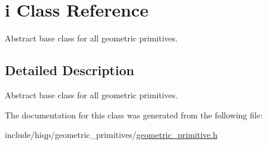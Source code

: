 \hypertarget{classi}{\section{i Class Reference}
\label{classi}
}


Abstract base class for all geometric primitives.  




\subsection{Detailed Description}
Abstract base class for all geometric primitives. 

The documentation for this class was generated from the following file\-:\begin{DoxyCompactItemize}
\item 
include/hiqp/geometric\-\_\-primitives/\hyperlink{geometric__primitive_8h}{geometric\-\_\-primitive.\-h}\end{DoxyCompactItemize}
